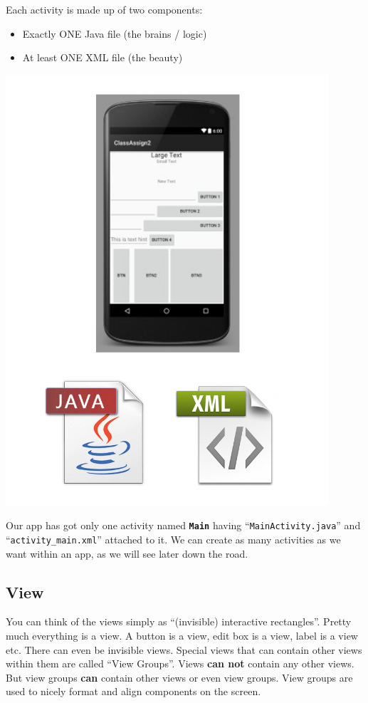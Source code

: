 Each activity is made up of two components: 
\begin{itemize}
	\item Exactly ONE Java file (the brains / logic)
	\item At least ONE XML file (the beauty)
\end{itemize}

\begin{center}
	\includegraphics[scale=0.4]{chapters/ch02/images/12_activity}
\end{center}


Our app has got only one activity named \texttt{\textbf{Main}} having ``\texttt{MainActivity.java}'' and ``\texttt{activity\_main.xml}'' attached to it. We can create as many activities as we want within an app, as we will see later down the road.

\subsection{View}
You can think of the views simply as ``(invisible) interactive rectangles''. Pretty much everything is a view. A button is a view, edit box is a view, label is a view etc. There can even be invisible views. Special views that can contain other views within them are called ``View Groups''. Views \textbf{can not} contain any other views. But view groups \textbf{can} contain other views or even view groups. View groups are used to nicely format and align components on the screen.

